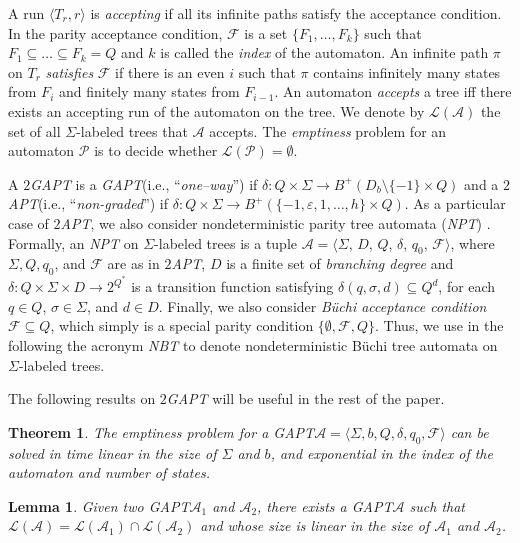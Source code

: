 \documentclass{LMCS}
\theoremstyle{plain}
\def \A             {\mathcal{A}}
\def \F             {\mathcal{F}}
\def \GAPT          {\emph{GAPT}\xspace}
\def \L             {\mathcal{L}}
\def \NBT           {\emph{NBT}\xspace}
\def \NPT           {\emph{NPT}\xspace}
\def \P             {\mathcal{P}}
\def \TAPT          {\emph{$2$APT}\xspace}
\def \TGAPT         {\emph{$2$GAPT}\xspace}
\newcommand \tpl[1] {\langle #1 \rangle}
\newtheorem{theorem}{Theorem}
\newtheorem{lemma}{Lemma}
\begin{document}
A run $\tpl{T_r,r}$ is \emph{accepting} if all its infinite paths
satisfy the acceptance condition. In the parity acceptance
condition, $\F$ is a set $\{F_1, \ldots , F_k\}$ such that $F_1
\subseteq \ldots \subseteq F_k = Q$ and $k$ is called the
\emph{index} of the automaton. An infinite path $\pi$ on $T_r$
\emph{satisfies} $\F$ if there is an even $i$ such that $\pi$
contains infinitely many states from $F_i$ and finitely many
states from $F_{i-1}$. An automaton \emph{accepts} a tree iff
there exists an accepting run of the automaton on the tree. We
denote by $\L(\A)$ the set of all $\Sigma$-labeled trees that $\A$
accepts. The \emph{emptiness} problem for an automaton $\P$ is to
decide whether $\L(\P)=\emptyset$.

A \TGAPT is a \GAPT (i.e., ``\emph{one--way}'') if $\delta: Q
\times \Sigma \rightarrow B^{+}(D_b \setminus \{-1\} \times Q)$
and a \TAPT (i.e., ``\emph{non-graded}'')  if $\delta : Q \times
\Sigma \rightarrow B^+(\{-1, \varepsilon, 1, \ldots, h\} \times
Q)$. As a particular case of \TAPT, we also consider
nondeterministic parity tree automata (\NPT) \cite{KVW00}.
Formally, an \NPT on $\Sigma$-labeled trees is a tuple $\A =
\langle \Sigma$, $D$, $Q$, $\delta$, $q_0$, $\F \rangle$, where
$\Sigma, Q, q_0$, and $\F$ are as in \TAPT, $D$ is a finite set of
\emph{branching degree} and $\delta: Q \times \Sigma \times D
\rightarrow 2^{Q^*}$ is a transition function satisfying
$\delta(q, \sigma, d) \subseteq Q^d$, for each $q \in Q$, $\sigma
\in \Sigma$, and $d \in D$. Finally, we also consider
\emph{B\"uchi acceptance condition} $\F \subseteq Q$, which simply
is a special parity condition $\{\emptyset, \F, Q\}$. Thus, we use
in the following the acronym \NBT to denote nondeterministic
B\"uchi tree automata on $\Sigma$-labeled trees.

The following results on \TGAPT will be useful in the rest of the
paper.

\begin{theorem}\cite{BLMV06}\label{the:TgaptEmptiness}
The emptiness problem for a \GAPT $\A = \tpl{\Sigma, b, Q, \delta,
q_0, \F}$ can be solved in time linear in the size of $\Sigma$ and
$b$, and exponential in the index of the automaton and number of
states.
\end{theorem}

\begin{lemma}\cite{BLMV06}\label{lem:TgaptIntersection}
Given two \GAPT $\A_1$ and $\A_2$, there exists a \GAPT $\A$ such
that $\L(\A) = \L(\A_1) \cap \L(\A_2)$ and whose size is linear in
the size of $\A_1$ and $\A_2$.
\end{lemma}
\end{document}
